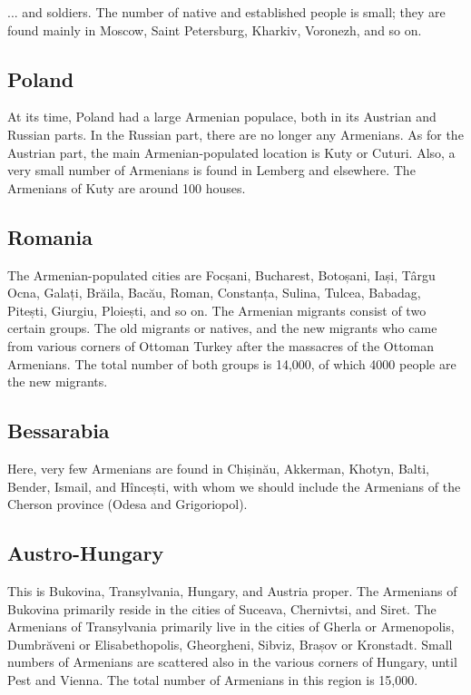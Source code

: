 ... and soldiers. The number of native and established people is small; they are found mainly in Moscow, Saint Petersburg, Kharkiv, Voronezh, and so on. 

\subsection{Poland}

At its time, Poland had a large Armenian populace, both in its Austrian and Russian parts. In the Russian part, there are no longer any Armenians. As for the Austrian part, the main Armenian-populated location is Kuty or Cuturi. Also, a very small number of Armenians is found in Lemberg and elsewhere. The Armenians of Kuty are around 100 houses.

\subsection{Romania}

The Armenian-populated cities are Focșani, Bucharest, Botoșani, Iași, Târgu Ocna, Galați, Brăila, Bacău, Roman, Constanța, Sulina, Tulcea, Babadag, Pitești, Giurgiu, Ploiești, and so on. The Armenian migrants consist of two certain groups. The old migrants or natives, and the new migrants who came from various corners of Ottoman Turkey after the massacres of the Ottoman Armenians. The total number of both groups is 14,000, of which 4000 people are the new migrants. 

\subsection{Bessarabia}

Here, very few Armenians are found in Chișinău, Akkerman, Khotyn, Balti, Bender, Ismail, and Hîncești, with whom we should include the Armenians of the Cherson province (Odesa and Grigoriopol).

\subsection{Austro-Hungary}

This is Bukovina, Transylvania, Hungary, and Austria proper. The Armenians of Bukovina primarily reside in the cities of Suceava, Chernivtsi, and Siret. The Armenians of Transylvania primarily live in the cities of Gherla or Armenopolis, Dumbrăveni  or Elisabethopolis, Gheorgheni, Sibviz, Brașov or Kronstadt. Small numbers of Armenians are scattered also in the various corners of Hungary, until Pest and Vienna. The total number of Armenians in this region is 15,000. 

